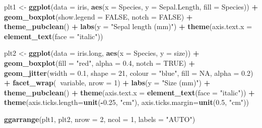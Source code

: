 \documentclass[english,10pt,a4paper,oneside]{book}
\newenvironment{Shaded}{\begin{snugshade}}{\end{snugshade}}
\newcommand{\DataTypeTok}[1]{\textcolor[rgb]{0.13,0.29,0.53}{#1}}
\newcommand{\DecValTok}[1]{\textcolor[rgb]{0.00,0.00,0.81}{#1}}
\newcommand{\FloatTok}[1]{\textcolor[rgb]{0.00,0.00,0.81}{#1}}
\newcommand{\KeywordTok}[1]{\textcolor[rgb]{0.13,0.29,0.53}{\textbf{#1}}}
\newcommand{\NormalTok}[1]{#1}
\newcommand{\OperatorTok}[1]{\textcolor[rgb]{0.81,0.36,0.00}{\textbf{#1}}}
\newcommand{\OtherTok}[1]{\textcolor[rgb]{0.56,0.35,0.01}{#1}}
\newcommand{\StringTok}[1]{\textcolor[rgb]{0.31,0.60,0.02}{#1}}
\theoremstyle{definition}
\theoremstyle{definition}
\theoremstyle{definition}
\theoremstyle{remark}
\begin{document}
\begin{Shaded}
\begin{Highlighting}[]
\NormalTok{plt1 <-}\StringTok{ }\KeywordTok{ggplot}\NormalTok{(}\DataTypeTok{data =}\NormalTok{ iris, }\KeywordTok{aes}\NormalTok{(}\DataTypeTok{x =}\NormalTok{ Species, }\DataTypeTok{y =}\NormalTok{ Sepal.Length, }\DataTypeTok{fill =}\NormalTok{ Species)) }\OperatorTok{+}
\StringTok{  }\KeywordTok{geom_boxplot}\NormalTok{(}\DataTypeTok{show.legend =} \OtherTok{FALSE}\NormalTok{, }\DataTypeTok{notch =} \OtherTok{FALSE}\NormalTok{) }\OperatorTok{+}\StringTok{ }\KeywordTok{theme_pubclean}\NormalTok{() }\OperatorTok{+}
\StringTok{  }\KeywordTok{labs}\NormalTok{(}\DataTypeTok{y =} \StringTok{"Sepal length (mm)"}\NormalTok{) }\OperatorTok{+}
\StringTok{  }\KeywordTok{theme}\NormalTok{(}\DataTypeTok{axis.text.x =} \KeywordTok{element_text}\NormalTok{(}\DataTypeTok{face =} \StringTok{"italic"}\NormalTok{))}

\NormalTok{plt2 <-}\StringTok{ }\KeywordTok{ggplot}\NormalTok{(}\DataTypeTok{data =}\NormalTok{ iris.long, }\KeywordTok{aes}\NormalTok{(}\DataTypeTok{x =}\NormalTok{ Species, }\DataTypeTok{y =}\NormalTok{ size)) }\OperatorTok{+}
\StringTok{  }\KeywordTok{geom_boxplot}\NormalTok{(}\DataTypeTok{fill =} \StringTok{"red"}\NormalTok{, }\DataTypeTok{alpha =} \FloatTok{0.4}\NormalTok{, }\DataTypeTok{notch =} \OtherTok{TRUE}\NormalTok{) }\OperatorTok{+}
\StringTok{  }\KeywordTok{geom_jitter}\NormalTok{(}\DataTypeTok{width =} \FloatTok{0.1}\NormalTok{, }\DataTypeTok{shape =} \DecValTok{21}\NormalTok{, }\DataTypeTok{colour =} \StringTok{"blue"}\NormalTok{, }\DataTypeTok{fill =} \OtherTok{NA}\NormalTok{, }\DataTypeTok{alpha =} \FloatTok{0.2}\NormalTok{) }\OperatorTok{+}
\StringTok{  }\KeywordTok{facet_wrap}\NormalTok{(}\OperatorTok{~}\NormalTok{variable, }\DataTypeTok{nrow =} \DecValTok{1}\NormalTok{) }\OperatorTok{+}
\StringTok{  }\KeywordTok{labs}\NormalTok{(}\DataTypeTok{y =} \StringTok{"Size (mm)"}\NormalTok{) }\OperatorTok{+}\StringTok{ }\KeywordTok{theme_pubclean}\NormalTok{() }\OperatorTok{+}
\StringTok{  }\KeywordTok{theme}\NormalTok{(}\DataTypeTok{axis.text.x =} \KeywordTok{element_text}\NormalTok{(}\DataTypeTok{face =} \StringTok{"italic"}\NormalTok{)) }\OperatorTok{+}
\StringTok{  }\KeywordTok{theme}\NormalTok{(}\DataTypeTok{axis.ticks.length=}\KeywordTok{unit}\NormalTok{(}\OperatorTok{-}\FloatTok{0.25}\NormalTok{, }\StringTok{"cm"}\NormalTok{), }\DataTypeTok{axis.ticks.margin=}\KeywordTok{unit}\NormalTok{(}\FloatTok{0.5}\NormalTok{, }\StringTok{"cm"}\NormalTok{))}

\KeywordTok{ggarrange}\NormalTok{(plt1, plt2, }\DataTypeTok{nrow =} \DecValTok{2}\NormalTok{, }\DataTypeTok{ncol =} \DecValTok{1}\NormalTok{, }\DataTypeTok{labels =} \StringTok{"AUTO"}\NormalTok{)}
\end{Highlighting}
\end{Shaded}
\end{document}

